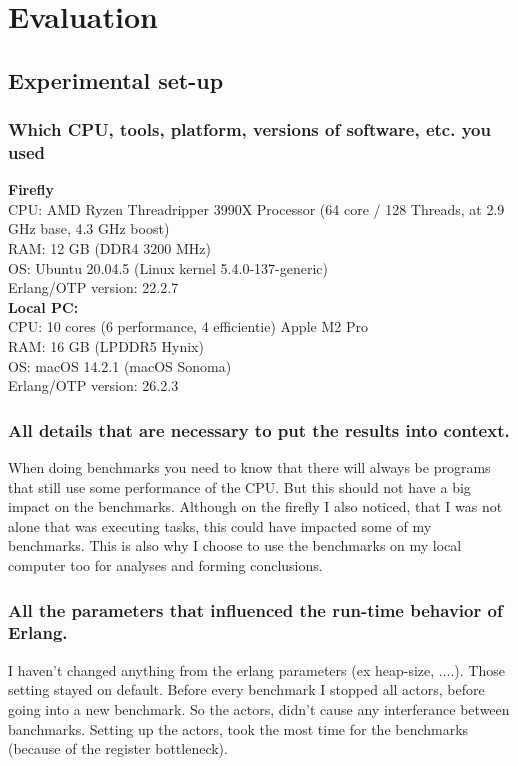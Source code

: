 \documentclass[a4paper]{article}
\begin{document}
\section{Evaluation}
\subsection{Experimental set-up}
\subsubsection{Which CPU, tools, platform, versions of software, etc. you used }
\textbf{Firefly} \\
CPU: AMD Ryzen Threadripper 3990X Processor (64 core / 128 Threads, at 2.9 GHz base, 4.3 GHz boost) \\
RAM: 12 GB (DDR4 3200 MHz) \\
OS: Ubuntu 20.04.5 (Linux kernel 5.4.0-137-generic) \\
Erlang/OTP version: 22.2.7 \\

\textbf{Local PC:} \\
CPU: 10 cores (6 performance, 4 efficientie) Apple M2 Pro \\
RAM: 16 GB (LPDDR5 Hynix) \\
OS: macOS 14.2.1 (macOS Sonoma) \\
Erlang/OTP version: 26.2.3 \\

\subsubsection{ All details that are necessary to put the results into context.}
When doing benchmarks you need to know that there will always be programs that still use some performance of the CPU. But this should not have a big impact on the benchmarks. Although on the firefly I also noticed, that I was not alone that was executing tasks, this could have impacted some of my benchmarks. This is also why I choose to use the benchmarks on my local computer too for analyses and forming conclusions.
\subsubsection{All the parameters that influenced the run-time behavior of Erlang.}
I haven't changed anything from the erlang parameters (ex heap-size, ....). Those setting stayed on default. Before every benchmark I stopped all actors, before going into a new benchmark. So the actors, didn't cause any interferance between banchmarks. Setting up the actors, took the most time for the benchmarks (because of the register bottleneck).
\end{document}
